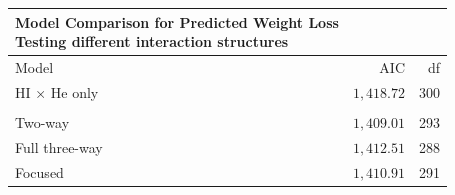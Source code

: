 \begin{longtable}{lrr}
\caption*{
{\large Model Comparison for Predicted Weight Loss} \\ 
{\small Testing different interaction structures}
} \\ 
\toprule
Model & AIC & df \\ 
\midrule\addlinespace[2.5pt]
HI × He only & $1,418.72$ & 300 \\ 
\cellcolor[HTML]{ADD8E6}{Main effects} & \cellcolor[HTML]{ADD8E6}{$1,406.68$} & \cellcolor[HTML]{ADD8E6}{299} \\ 
Two-way & $1,409.01$ & 293 \\ 
Full three-way & $1,412.51$ & 288 \\ 
Focused & $1,410.91$ & 291 \\ 
\bottomrule
\end{longtable}

